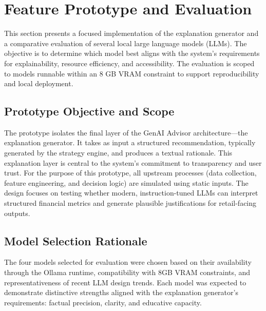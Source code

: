 \section{Feature Prototype and Evaluation}

This section presents a focused implementation of the explanation generator and a comparative evaluation of several local large language models (LLMs). The objective is to determine which model best aligns with the system’s requirements for explainability, resource efficiency, and accessibility. The evaluation is scoped to models runnable within an 8 GB VRAM constraint to support reproducibility and local deployment.

\subsection{Prototype Objective and Scope}

The prototype isolates the final layer of the GenAI Advisor architecture—the explanation generator. It takes as input a structured recommendation, typically generated by the strategy engine, and produces a textual rationale. This explanation layer is central to the system's commitment to transparency and user trust. For the purpose of this prototype, all upstream processes (data collection, feature engineering, and decision logic) are simulated using static inputs. The design focuses on testing whether modern, instruction-tuned LLMs can interpret structured financial metrics and generate plausible justifications for retail-facing outputs.

\subsection{Model Selection Rationale}

The four models selected for evaluation were chosen based on their availability through the Ollama runtime, compatibility with 8GB VRAM constraints, and representativeness of recent LLM design trends. Each model was expected to demonstrate distinctive strengths aligned with the explanation generator’s requirements: factual precision, clarity, and educative capacity.

